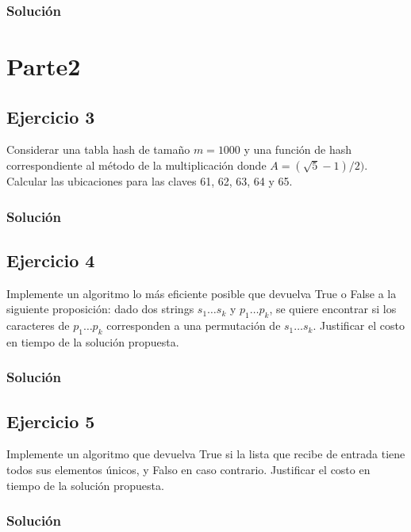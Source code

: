 \documentclass{article}
\begin{document}
\subsubsection*{Solución}


\section*{Parte2}
\subsection*{Ejercicio 3}
Considerar una tabla hash de tamaño $m = 1000$ y una función de hash correspondiente al método de la multiplicación donde $A = (\sqrt{5}-1)/2)$. Calcular las ubicaciones para las claves 61, 62, 63, 64 y 65.
\subsubsection*{Solución}


\subsection*{Ejercicio 4}
Implemente un algoritmo lo más eficiente posible que devuelva True o False a la siguiente proposición: dado dos strings $s_1 \dots s_k$ y $p_1 \dots p_k$, se quiere encontrar si los caracteres de $p_1 \dots p_k$ corresponden a una permutación de $s_1 \dots s_k$. Justificar el costo en tiempo de la solución propuesta.
\subsubsection*{Solución}


\subsection*{Ejercicio 5}
Implemente un algoritmo que devuelva True si la lista que recibe de entrada tiene todos sus elementos únicos, y Falso en caso contrario. Justificar el costo en tiempo de la solución propuesta.
\subsubsection*{Solución}
\end{document}
